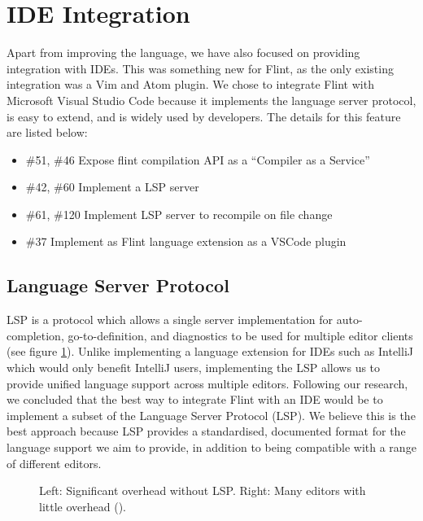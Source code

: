 \section{IDE Integration}

Apart from improving the language, we have also focused on providing integration with IDEs. This was something new for Flint, as the only existing integration was a Vim and Atom plugin. We chose to integrate Flint with Microsoft Visual Studio Code because it implements the language server protocol, is easy to extend, and is widely used by developers. The details for this feature are listed below:

\begin{itemize}
	\item \#51, \#46 Expose flint compilation API as a “Compiler as a Service”
	\item \#42, \#60 Implement a LSP server
	\item \#61, \#120 Implement LSP server to recompile on file change
	\item \#37 Implement as Flint language extension as a VSCode plugin
\end{itemize}

\subsection{Language Server Protocol}

LSP is a protocol which allows a single server implementation for auto-completion, go-to-definition, and diagnostics to be used for multiple editor clients (see figure \ref{lsp}). Unlike implementing a language extension for IDEs such as IntelliJ which would only benefit IntelliJ users, implementing the LSP allows us to provide unified language support across multiple editors. Following our research, we concluded that the best way to integrate Flint with an IDE would be to implement a subset of the Language Server Protocol (LSP). We believe this is the best approach because LSP provides a standardised, documented format for the language support we aim to provide, in addition to being compatible with a range of different editors.

\begin{figure}[htbp]
\centering
{}
\caption{Left: Significant overhead without LSP. Right: Many editors with little overhead (\textcite{lsp-figure}).}
\label{lsp}
\end{figure}

